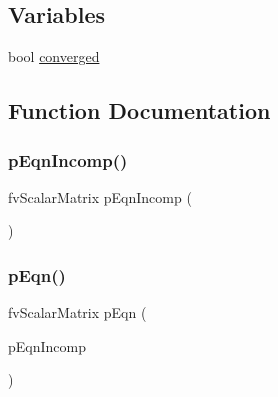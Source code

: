 \subsection*{Variables}
\begin{DoxyCompactItemize}
\item 
bool \hyperlink{solveP__rgh__2p_8H_afcd780f72325f856f84ec1de84464211}{converged}
\end{DoxyCompactItemize}


\subsection{Function Documentation}
\mbox{\label{solveP__rgh__2p_8H_a73205a3cb71010293a28021e0feabba5}} 
\subsubsection{\texorpdfstring{p\+Eqn\+Incomp()}{pEqnIncomp()}}
{\footnotesize\ttfamily fv\+Scalar\+Matrix p\+Eqn\+Incomp (\begin{DoxyParamCaption}\item[{fvc\+::div(phi\+HbyA) -\/ fvm\+::laplacian(\hyperlink{calcrAUfSetSnGradCalcComp__1p_8H_a61479bb7ccdc1151cea5792eab56d00e}{r\+A\+Uf}, \hyperlink{updatePP__rghRho__2p_8H_a320090d1a3c1675778a59e981765c77c}{p\+\_\+rgh\+\_\+})}]{ }\end{DoxyParamCaption})}

\mbox{\label{solveP__rgh__2p_8H_a2181bb507e6192fba9adef805bdb5892}} 
\subsubsection{\texorpdfstring{p\+Eqn()}{pEqn()}}
{\footnotesize\ttfamily fv\+Scalar\+Matrix p\+Eqn (\begin{DoxyParamCaption}\item[{\hyperlink{calcComp__2p_8H_a92a3a7292cb18de09b0b1a96a1f5b324}{p\+Eqn\+Comp1}()+\hyperlink{calcComp__2p_8H_a3df9c3de4511043ef8fa72f7853eeef1}{p\+Eqn\+Comp2}()+}]{p\+Eqn\+Incomp }\end{DoxyParamCaption})}

